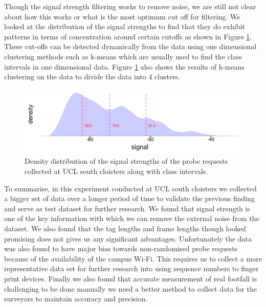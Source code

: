 Though the signal strength filtering works to remove noise, we are still not clear about how this works or what is the most optimum cut off for filtering.
We looked at the distribution of the signal strengths to find that they do exhibit patterns in terms of concentration around certain cutoffs as shown in Figure \ref{figure:collection:ucl:signal}.
These cut-offs can be detected dynamically from the data using one dimensional clustering methods such as k-means which are usually used to find the class intervals in one dimensional data.
Figure \ref{figure:collection:ucl:signal} also shows the results of k-means clustering on the data to divide the data into 4 clusters.

\begin{figure}
\includegraphics[trim={5 5 5 5},clip]{images/ucl-signal-dist.png}
  \caption{Density distribution of the signal strengths of the probe requests collected at UCL south cloisters along with class intervals.}
  \label{figure:collection:ucl:signal}
\end{figure}

To summarise, in this experiment conducted at UCL south cloisters we collected a bigger set of data over a longer period of time to validate the previous finding and serve as test dataset for further research.
We found that signal strength is one of the key information with which we can remove the external noise from the dataset.
We also found that the tag lengths and frame lengths though looked promising does not gives us any significant advantages. 
Unfortunately the data was also found to have major bias towards non-randomised probe requests because of the availability of the campus Wi-Fi.
This requires us to collect a more representative data set for further research into using sequence numbers to finger print devices.
Finally we also found that accurate measurement of real footfall is challenging to be done manually we need a better method to collect data for the surveyors to maintain accuracy and precision.

